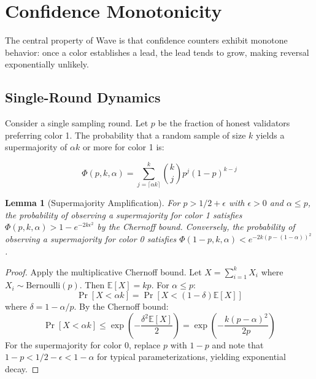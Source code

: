 \documentclass[11pt,a4paper]{article}
\newtheorem{lemma}[theorem]{Lemma}
\begin{document}
\section{Confidence Monotonicity}
\label{sec:analysis}

The central property of Wave is that confidence counters exhibit monotone behavior:
once a color establishes a lead, the lead tends to grow, making reversal exponentially
unlikely.

\subsection{Single-Round Dynamics}

Consider a single sampling round. Let $p$ be the fraction of honest validators
preferring color 1. The probability that a random sample of size $k$ yields a
supermajority of $\alpha k$ or more for color 1 is:

\begin{equation}
\Phi(p, k, \alpha) = \sum_{j = \lceil \alpha k \rceil}^{k} \binom{k}{j} p^j (1-p)^{k-j}
\label{eq:supermajority}
\end{equation}

\begin{lemma}[Supermajority Amplification]
\label{lem:amplification}
For $p > 1/2 + \epsilon$ with $\epsilon > 0$ and $\alpha \leq p$, the probability of
observing a supermajority for color 1 satisfies $\Phi(p, k, \alpha) > 1 - e^{-2k\epsilon^2}$
by the Chernoff bound. Conversely, the probability of observing a supermajority for
color 0 satisfies $\Phi(1-p, k, \alpha) < e^{-2k(p - (1-\alpha))^2}$.
\end{lemma}

\begin{proof}
Apply the multiplicative Chernoff bound. Let $X = \sum_{i=1}^{k} X_i$ where $X_i \sim \text{Bernoulli}(p)$.
Then $\mathbb{E}[X] = kp$. For $\alpha \leq p$:
\[
\Pr[X < \alpha k] = \Pr[X < (1 - \delta)\mathbb{E}[X]]
\]
where $\delta = 1 - \alpha/p$. By the Chernoff bound:
\[
\Pr[X < \alpha k] \leq \exp\left(-\frac{\delta^2 \mathbb{E}[X]}{2}\right) = \exp\left(-\frac{k(p - \alpha)^2}{2p}\right)
\]
For the supermajority for color 0, replace $p$ with $1-p$ and note that $1-p < 1/2 - \epsilon < 1-\alpha$
for typical parameterizations, yielding exponential decay.
\end{proof}
\end{document}
